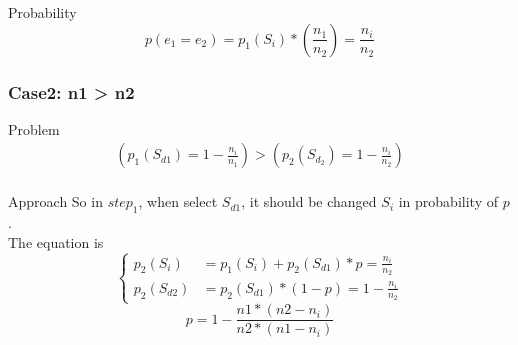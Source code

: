 \documentclass[notheorems, aspectratio=54]{beamer}
\begin{document}
\begin{frame}
    \begin{block}{Probability}
        $$
            p(e_1 = e_2) = p_1(S_i)*(\frac{n_1}{n_2}) = \frac{n_i}{n_2}
        $$
    \end{block}
\end{frame}

\begin{frame}
    \frametitle{Case2: n1 > n2}
    \begin{block}{Problem}
        \begin{equation}
            \begin{aligned}
                (p_1(S_{d1}) = 1-\frac{n_i}{n_1}) > (p_2(S_{d_2}) = 1-\frac{n_i}{n_2}) \\
            \end{aligned}
        \end{equation}
    \end{block}
    \begin{block}{Approach}
        So in $step_1$, when select $S_{d1}$, it should be changed $S_{i}$ in probability of $p$. \\
        The equation is 
            \begin{equation}
                \left\{
                \begin{aligned}
                    p_2(S_i) &= p_1(S_i)+p_2(S_{d1})*p = \frac{n_i}{n_2} \\
                    p_2(S_{d2}) &= p_2(S_{d1})*(1-p) = 1-\frac{n_i}{n_2}
                \end{aligned}
                \right. 
            \end{equation}
            \begin{equation}
                p = 1-\frac{n1*(n2-n_i)}{n2*(n1-n_i)}
            \end{equation}
    \end{block}
\end{frame}
\end{document}
